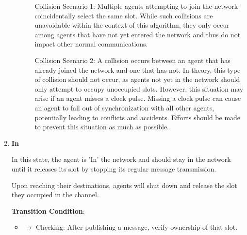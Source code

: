 \begin{enumerate}
\begin{itemize}
\begin{itemize}
            Collision Scenario 1: Multiple agents attempting to join the network coincidentally select the same slot. While such collisions are unavoidable within the context of this algorithm, they only occur among agents that have not yet entered the network and thus do not impact other normal communications.
            
            Collision Scenario 2: A collision occurs between an agent that has already joined the network and one that has not. In theory, this type of collision should not occur, as agents not yet in the network should only attempt to occupy unoccupied slots. However, this situation may arise if an agent misses a clock pulse. Missing a clock pulse can cause an agent to fall out of synchronization with all other agents, potentially leading to conflicts and accidents. Efforts should be made to prevent this situation as much as possible.
        \end{itemize}

    \end{itemize}    


    \item \textbf{In}
    
    In this state, the agent is 'In' the network and should stay in the network until it releases its slot by stopping its regular message transmission.
    
    Upon reaching their destinations, agents will shut down and release the slot they occupied in the channel.
    
    \textbf{Transition Condition}:
    \begin{itemize}
        \item $\rightarrow$ Checking: After publishing a message, verify ownership of that slot.
    \end{itemize}

\end{enumerate}

